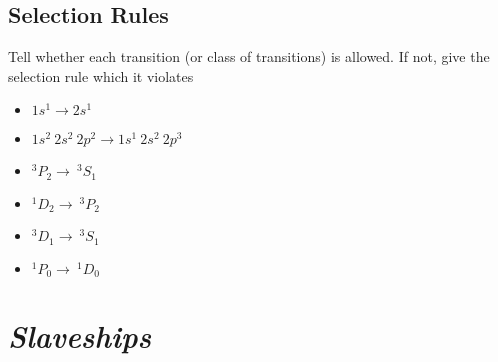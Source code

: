 \documentclass[11pt, letterpaper]{memoir}
\begin{document}
{\subsection*{Selection Rules}
Tell whether each transition (or class of transitions) is allowed. If not, give the selection rule which it violates

\begin{itemize}
	\item $1s^1\rightarrow2s^1$

	      \vspace{3em}
	\item $1s^2~2s^2~2p^2\rightarrow 1s^1~2s^2~2p^3$

	      \vspace{3em}
	\item $^3P_2 \rightarrow ~ ^3S_1$

	      \vspace{3em}
	\item $^1D_2 \rightarrow ~ ^3P_2$

	      \vspace{3em}
	\item $^3D_1 \rightarrow ~ ^3S_1$

	      \vspace{3em}
	\item $^1P_0 \rightarrow ~ ^1D_0$
\end{itemize}

\newpage
\pagestyle{empty}
\addtocounter{page}{-1}
\section*{\emph{Slaveships}}
}
\end{document}

